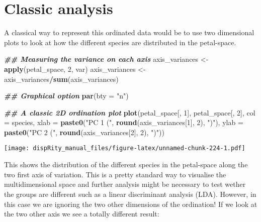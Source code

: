 \documentclass[
]{book}
\newenvironment{Shaded}{\begin{snugshade}}{\end{snugshade}}
\newcommand{\AttributeTok}[1]{\textcolor[rgb]{0.13,0.29,0.53}{#1}}
\newcommand{\DecValTok}[1]{\textcolor[rgb]{0.00,0.00,0.81}{#1}}
\newcommand{\DocumentationTok}[1]{\textcolor[rgb]{0.56,0.35,0.01}{\textbf{\textit{#1}}}}
\newcommand{\FunctionTok}[1]{\textcolor[rgb]{0.13,0.29,0.53}{\textbf{#1}}}
\newcommand{\NormalTok}[1]{#1}
\newcommand{\OtherTok}[1]{\textcolor[rgb]{0.56,0.35,0.01}{#1}}
\newcommand{\SpecialCharTok}[1]{\textcolor[rgb]{0.81,0.36,0.00}{\textbf{#1}}}
\newcommand{\StringTok}[1]{\textcolor[rgb]{0.31,0.60,0.02}{#1}}
\begin{document}
\hypertarget{classic-analysis}{%
\section{Classic analysis}\label{classic-analysis}}

A classical way to represent this ordinated data would be to use two dimensional plots to look at how the different species are distributed in the petal-space.

\begin{Shaded}
\begin{Highlighting}[]
\DocumentationTok{\#\# Measuring the variance on each axis}
\NormalTok{axis\_variances }\OtherTok{\textless{}{-}} \FunctionTok{apply}\NormalTok{(petal\_space, }\DecValTok{2}\NormalTok{, var)}
\NormalTok{axis\_variances }\OtherTok{\textless{}{-}}\NormalTok{ axis\_variances}\SpecialCharTok{/}\FunctionTok{sum}\NormalTok{(axis\_variances)}

\DocumentationTok{\#\# Graphical option}
\FunctionTok{par}\NormalTok{(}\AttributeTok{bty =} \StringTok{"n"}\NormalTok{)}

\DocumentationTok{\#\# A classic 2D ordination plot}
\FunctionTok{plot}\NormalTok{(petal\_space[, }\DecValTok{1}\NormalTok{], petal\_space[, }\DecValTok{2}\NormalTok{], }\AttributeTok{col =}\NormalTok{ species,}
    \AttributeTok{xlab =} \FunctionTok{paste0}\NormalTok{(}\StringTok{"PC 1 ("}\NormalTok{, }\FunctionTok{round}\NormalTok{(axis\_variances[}\DecValTok{1}\NormalTok{], }\DecValTok{2}\NormalTok{), }\StringTok{")"}\NormalTok{),}
    \AttributeTok{ylab =} \FunctionTok{paste0}\NormalTok{(}\StringTok{"PC 2 ("}\NormalTok{, }\FunctionTok{round}\NormalTok{(axis\_variances[}\DecValTok{2}\NormalTok{], }\DecValTok{2}\NormalTok{), }\StringTok{")"}\NormalTok{))}
\end{Highlighting}
\end{Shaded}

\texttt{[image: dispRity\_manual\_files/figure-latex/unnamed-chunk-224-1.pdf]}

This shows the distribution of the different species in the petal-space along the two first axis of variation.
This is a pretty standard way to visualise the multidimensional space and further analysis might be necessary to test wether the groups are different such as a linear discriminant analysis (LDA).
However, in this case we are ignoring the two other dimensions of the ordination!
If we look at the two other axis we see a totally different result:
\end{document}
